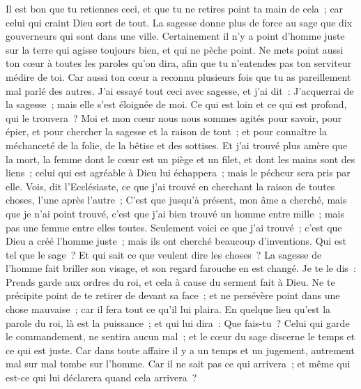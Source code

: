 \begin{multicols}{2}
Il est bon que tu retiennes ceci, et que tu ne retires point ta main de cela~; car celui qui craint Dieu sort de tout.
La sagesse donne plus de force au sage que dix gouverneurs qui sont dans une ville.
Certainement il n'y a point d'homme juste sur la terre qui agisse toujours bien, et qui ne pèche point.
Ne mets point aussi ton cœur à toutes les paroles qu'on dira, afin que tu n'entendes pas ton serviteur médire de toi. 
Car aussi ton cœur a reconnu plusieurs fois que tu as pareillement mal parlé des autres. 
J'ai essayé tout ceci avec sagesse, et j'ai dit~: J'acquerrai de la sagesse~; mais elle s'est éloignée de moi. 
Ce qui est loin et ce qui est profond, qui le trouvera~?
Moi et mon cœur nous nous sommes agités pour savoir, pour épier, et pour chercher la sagesse et la raison de tout~; et pour connaître la méchanceté de la folie, de la bêtise et des sottises. 
Et j'ai trouvé plus amère que la mort, la femme dont le cœur est un piège et un filet, et dont les mains sont des liens~; celui qui est agréable à Dieu lui échappera~; mais le pécheur sera pris par elle.
Vois, dit l'Ecclésiaste, ce que j'ai trouvé en cherchant la raison de toutes choses, l'une après l'autre~;
C'est que jusqu'à présent, mon âme a cherché, mais que je n'ai point trouvé, c'est que j'ai bien trouvé un homme entre mille~; mais pas une femme entre elles toutes. 
Seulement voici ce que j'ai trouvé~; c'est que Dieu a créé l'homme juste~; mais ils ont cherché beaucoup d'inventions.
\VerseOne{}Qui est tel que le sage~? Et qui sait ce que veulent dire les choses~? La sagesse de l'homme fait briller son visage, et son regard farouche en est changé.
Je te le dis~: Prends garde aux ordres du roi, et cela à cause du serment fait à Dieu.
Ne te précipite point de te retirer de devant sa face~; et ne persévère point dans une chose mauvaise~; car il fera tout ce qu'il lui plaira. 
En quelque lieu qu'est la parole du roi, là est la puissance~; et qui lui dira~: Que fais-tu~? 
Celui qui garde le commandement, ne sentira aucun mal~; et le cœur du sage discerne le temps et ce qui est juste. 
Car dans toute affaire il y a un temps et un jugement, autrement mal sur mal tombe sur l'homme. 
Car il ne sait pas ce qui arrivera~; et même qui est-ce qui lui déclarera quand cela arrivera~? 

\end{multicols}
